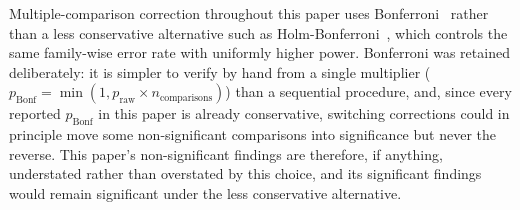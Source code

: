\documentclass[11pt]{article}
\begin{document}
Multiple-comparison correction throughout this paper uses Bonferroni~\cite{dunn1961multiple} rather than a less conservative alternative such as Holm-Bonferroni~\cite{holm1979sequential}, which controls the same family-wise error rate with uniformly higher power. Bonferroni was retained deliberately: it is simpler to verify by hand from a single multiplier ($p_{\text{Bonf}} = \min(1, p_{\text{raw}} \times n_{\text{comparisons}})$) than a sequential procedure, and, since every reported $p_{\text{Bonf}}$ in this paper is already conservative, switching corrections could in principle move some non-significant comparisons into significance but never the reverse. This paper's non-significant findings are therefore, if anything, understated rather than overstated by this choice, and its significant findings would remain significant under the less conservative alternative.
\end{document}
